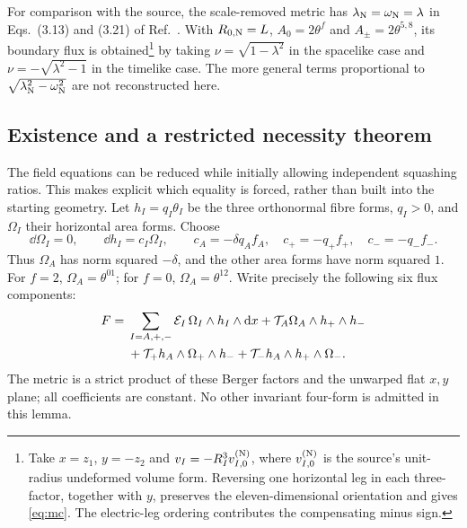 For comparison with the source, the scale-removed metric has $\lambda_{\rm N}=\omega_{\rm N}=\lambda$ in Eqs.~(3.13) and (3.21) of Ref.~\cite{Noris2026}. With $R_{0,\rm N}=L$, $A_0=2\theta^f$ and $A_\pm=2\theta^{5,8}$, its boundary flux is obtained\footnote{Take $x=z_1$, $y=-z_2$ and $v_I=-R_I^3v^{(\rm N)}_{I,0}$, where $v^{(\rm N)}_{I,0}$ is the source's unit-radius undeformed volume form. Reversing one horizontal leg in each three-factor, together with $y$, preserves the eleven-dimensional orientation and gives \eqref{eq:mc}. The electric-leg ordering contributes the compensating minus sign.} by taking $\nu=\sqrt{1-\lambda^2}$ in the spacelike case and $\nu=-\sqrt{\lambda^2-1}$ in the timelike case. The more general terms proportional to $\sqrt{\lambda_{\rm N}^2-\omega_{\rm N}^2}$ are not reconstructed here.

\subsection{Existence and a restricted necessity theorem}
The field equations can be reduced while initially allowing independent squashing ratios. This makes explicit which equality is forced, rather than built into the starting geometry. Let $h_I=q_I\theta_I$ be the three orthonormal fibre forms, $q_I>0$, and $\Omega_I$ their horizontal area forms. Choose
\begin{equation}
\dd\Omega_I=0,\qquad \dd h_I=c_I\Omega_I,
\qquad c_A=-\delta q_Af_A,\quad c_+=-q_+f_+,\quad c_-=-q_-f_-.
\label{eq:hopf-curvatures}
\end{equation}
Thus $\Omega_A$ has norm squared $-\delta$, and the other area forms have norm squared $1$. For $f=2$, $\Omega_A=\theta^{01}$; for $f=0$, $\Omega_A=\theta^{12}$. Write precisely the following six flux components:
\begin{align}
F={}&\sum_{I=A,+,-}\mathcal E_I\,\Omega_I\wedge h_I\wedge\mathrm{d} x
+\mathcal T_A\Omega_A\wedge h_+\wedge h_-\notag\\
&+\mathcal T_+h_A\wedge\Omega_+\wedge h_-
+\mathcal T_-h_A\wedge h_+\wedge\Omega_-.
\label{eq:six-flux}
\end{align}
The metric is a strict product of these Berger factors and the unwarped flat $x,y$ plane; all coefficients are constant. No other invariant four-form is admitted in this lemma.

